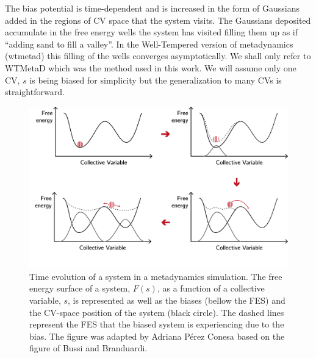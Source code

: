 The bias 
potential 
is time-dependent and is increased in the form of Gaussians added in the regions of CV space 
that 
the system visits. The Gaussians deposited accumulate in the free energy wells the system has 
visited filling them up as if ``adding sand to fill a valley''. In the Well-Tempered version of 
metadynamics\cite{Barducci2008,Dama2014} (\gls{wtmetad}) this filling of the wells converges 
asymptotically\cite{Dama2014}. 
We shall only refer to WTMetaD which was the method used in this work. We will assume only one CV, 
$s$ is being biased for simplicity but the generalization to many CVs is straightforward.

\begin{figure}
\centering 
\includegraphics[width=\columnwidth]{./images/MetaD.png}
\caption[Metadynamics algorithm]{Time evolution of a system in a metadynamics simulation. The free 
energy surface of a system, $F(s)$, as a function of 
a collective variable, $s$, is represented as well as the biases (bellow the FES) and the 
CV-space position of the system (black circle). The dashed lines represent the FES that the 
biased system is experiencing due to the bias. The figure was adapted by Adriana Pérez Conesa 
based on the figure of Bussi and Branduardi.\cite{bussi2015free_v2} }
\label{MetaD_Figure}
\end{figure}

